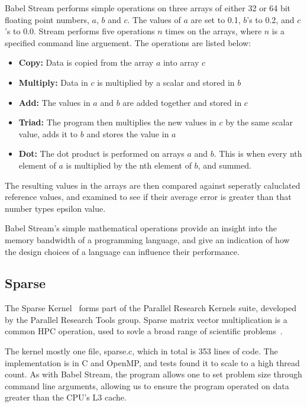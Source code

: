 Babel Stream performs simple operations on three arrays of either 32 or 64 bit floating point numbers, $a$, $b$ and $c$. The values of $a$ are set to 0.1, $b$'s to 0.2, and $c$'s to 0.0. Stream performs five operations $n$ times on the arrays, where $n$ is a specified command line arguement. The operations are listed below:
\begin{itemize}
  \item \textbf{Copy:} Data is copied from the array $a$ into array $c$
  \item \textbf{Multiply:} Data in $c$ is multiplied by a scalar and stored in $b$
  \item \textbf{Add:} The values in $a$ and $b$ are added together and stored in $c$
  \item \textbf{Triad:} The program then multiplies the new values in $c$ by the same scalar value, adds it to $b$ and stores the value in $a$
  \item \textbf{Dot:} The dot product is performed on arrays $a$ and $b$. This is when every nth element of $a$ is multiplied by the nth element of $b$, and summed.
\end{itemize}
The resulting values in the arrays are then compared against seperatly caluclated reference values, and examined to see if their average error is greater than that number types epsilon value.

Babel Stream's simple mathematical operations provide an insight into the memory bandwidth of a programming language, and give an indication of how the  design choices of a language can influence their performance.

\subsection{Sparse}

The Sparse Kernel~\cite{ParResSparse} forms part of the Parallel Research Kernels suite, developed by the Parallel Research Tools group. Sparse matrix vector multiplication is a common HPC operation, used to sovle a broad range of scientific problems~\cite{Sedaghati:2015, spMVGPU, DBLP:journals}.

The kernel mostly one file, sparse.c, which in total is 353 lines of code. The implementation is in C and OpenMP, and tests found it to scale to a high thread count. As with Babel Stream, the program allows one to set problem size through command line arguments, allowing us to ensure the program operated on data greater than the CPU's L3 cache.

